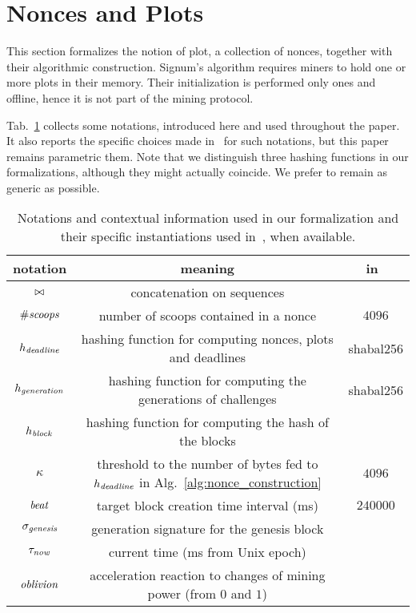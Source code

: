 \section{Nonces and Plots}\label{sec:nonces_and_plots}

This section formalizes the notion of plot, a collection of nonces, together with their
algorithmic construction. Signum's algorithm requires miners to hold one or more plots
in their memory. Their initialization is performed only ones and offline, hence it is
not part of the mining protocol.

Tab.~\ref{tab:notations} collects some notations,
introduced here and used throughout the paper.
It also reports the specific choices
made in~\cite{SignumPlotting} for such notations, but this paper remains parametric \wrt them.
Note that we distinguish three hashing functions in our formalizations, although they
might actually coincide. We prefer to remain as generic as possible.

\begin{table}[t]
\begin{center}
\begin{tabular}{|c|c|c|}
  \hline
  \textbf{notation} & \textbf{meaning} & \textbf{in~\cite{SignumPlotting}}\\\hline\hline

  $\operatorname*{\bowtie}$ & concatenation on sequences & \\\hline
  ${\#\mathit{scoops}}$ & number of scoops contained in a nonce & $4096$\\\hline

  $h_{\mathit{deadline}}$ & hashing function for computing nonces, plots and deadlines & shabal256\\\hline

  $h_{\mathit{generation}}$ & hashing function for computing the generations of challenges & shabal256\\\hline

  $h_{\mathit{block}}$ & hashing function for computing the hash of the blocks & \\\hline

  $\kappa$ & threshold to the number of bytes fed to $h_{\mathit{deadline}}$ in Alg.~\ref{alg:nonce_construction} & $4096$\\\hline

  ${\mathit{beat}}$ & target block creation time interval (ms) & $240000$ \\\hline

  $\sigma_{\mathit{genesis}}$ & generation signature for the genesis block & \\\hline

  $\tau_{\mathit{now}}$ & current time (ms from Unix epoch) & \\\hline

  ${\mathit{oblivion}}$ & acceleration reaction to changes of mining power (from $0$ and $1$) & \\\hline
\end{tabular}
\end{center}
\caption{Notations and contextual information used in our formalization and their specific instantiations
  used in~\cite{SignumPlotting}, when available.}
\label{tab:notations}
\end{table}


